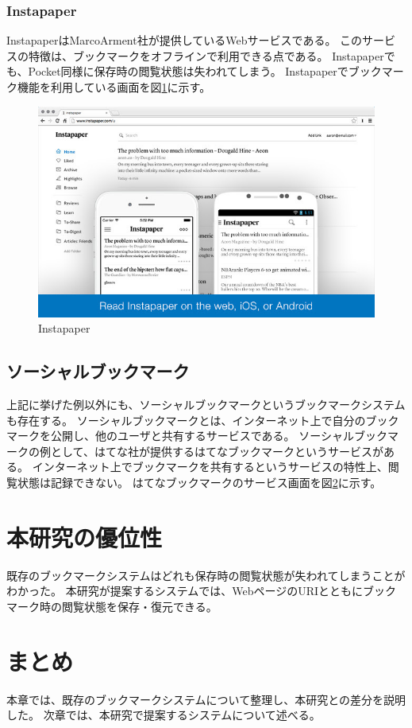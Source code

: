 \subsubsection{Instapaper}
InstapaperはMarcoArment社\cite{}が提供しているWebサービスである。
このサービスの特徴は、ブックマークをオフラインで利用できる点である。
Instapaperでも、Pocket同様に保存時の閲覧状態は失われてしまう。
Instapaperでブックマーク機能を利用している画面を図\ref{fig:instapaper}に示す。

\begin{figure}[htbp]
  \caption{Instapaper}
  \label{fig:instapaper}
  \begin{center}
    \includegraphics[bb=0 0 640 400,width=15cm]{img/020_related_works/instapaper.pdf}
  \end{center}
\end{figure}

\subsection{ソーシャルブックマーク}
上記に挙げた例以外にも、ソーシャルブックマークというブックマークシステムも存在する。
ソーシャルブックマークとは、インターネット上で自分のブックマークを公開し、他のユーザと共有するサービスである\cite{}。
ソーシャルブックマークの例として、はてな社\cite{}が提供するはてなブックマーク\cite{}というサービスがある。
インターネット上でブックマークを共有するというサービスの特性上、閲覧状態は記録できない。
はてなブックマークのサービス画面を図\ref{}に示す。

\section{本研究の優位性}
既存のブックマークシステムはどれも保存時の閲覧状態が失われてしまうことがわかった。
本研究が提案するシステムでは、WebページのURIとともにブックマーク時の閲覧状態を保存・復元できる。

\section{まとめ}
本章では、既存のブックマークシステムについて整理し、本研究との差分を説明した。
次章では、本研究で提案するシステムについて述べる。